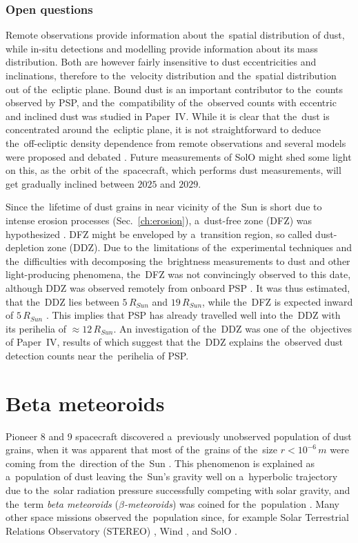 \subsubsection{Open questions}

Remote observations provide information about the~spatial distribution of dust, while in-situ detections and modelling provide information about its mass distribution. Both are however fairly insensitive to dust eccentricities and inclinations, therefore to the~velocity distribution and the~spatial distribution out of the~ecliptic plane. Bound dust is an important contributor to the~counts observed by PSP, and the~compatibility of the~observed counts with eccentric and inclined dust was studied in Paper~IV. While it is clear that the~dust is concentrated around the~ecliptic plane, it is not straightforward to deduce the~off-ecliptic density dependence from remote observations and several models were proposed and debated \citep{giese1986three}. Future measurements of SolO might shed some light on this, as the~orbit of the~spacecraft, which performs dust measurements, will get gradually inclined between $2025$ and $2029$.

Since the~lifetime of dust grains in near vicinity of the~Sun is short due to intense erosion processes (Sec.~\ref{ch:erosion}), a~dust-free zone (DFZ) was hypothesized \citep{russell1929meteoric}. DFZ might be enveloped by a~transition region, so called dust-depletion zone (DDZ). Due to the~limitations of the~experimental techniques and the~difficulties with decomposing the~brightness measurements to dust and other light-producing phenomena, the~DFZ was not convincingly observed to this date, although DDZ was observed remotely from onboard PSP \citep{stenborg2018characterization}. It was thus estimated, that the~DDZ lies between $5 \, R_{Sun}$ and $19 \, R_{Sun}$, while the~DFZ is expected inward of $5 \, R_{Sun}$ \citep{stenborg2022psp}. This implies that PSP has already travelled well into the~DDZ with its perihelia of $\approx 12 \, R_{Sun}$. An investigation of the~DDZ was one of the~objectives of Paper~IV, results of which suggest that the~DDZ explains the~observed dust detection counts near the~perihelia of PSP.

\section{Beta meteoroids}

Pioneer 8 and 9 spacecraft discovered a~previously unobserved population of dust grains, when it was apparent that most of the~grains of the~size $r < 10^{-6} \, \si{m}$ were coming from the~direction of the~Sun \citep{berg1973evidence}. This phenomenon is explained as a~population of dust leaving the~Sun's gravity well on a~hyperbolic trajectory due to the~solar radiation pressure successfully competing with solar gravity, and the~term \textit{beta meteoroids} ($\beta$\textit{-meteoroids}) was coined for the~population \citep{zook1975source}. Many other space missions observed the~population since, for example Solar Terrestrial Relations Observatory ({STEREO}) \citep{zaslavsky2012interplanetary}, Wind \citep{malaspina2014interplanetary}, and SolO \citep{zaslavsky2021first}.

